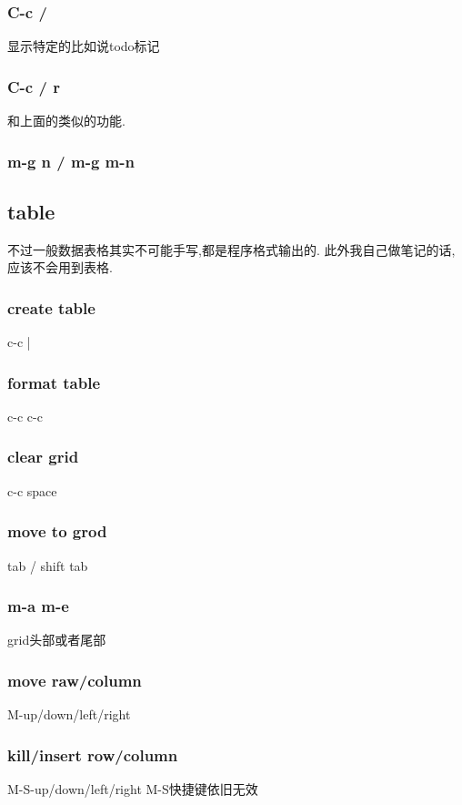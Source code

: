 \documentclass[12pt,a4paper]{article}
\begin{document}
\subsubsection{C-c /}
\label{sec:orgheadline58}
显示特定的比如说todo标记
\subsubsection{C-c / r}
\label{sec:orgheadline59}
和上面的类似的功能.
\subsubsection{m-g n / m-g m-n}
\label{sec:orgheadline60}
\subsection{table}
\label{sec:orgheadline70}
不过一般数据表格其实不可能手写,都是程序格式输出的.
此外我自己做笔记的话,应该不会用到表格.
\subsubsection{create table}
\label{sec:orgheadline62}
c-c |
\subsubsection{format table}
\label{sec:orgheadline63}
c-c c-c
\subsubsection{clear grid}
\label{sec:orgheadline64}
c-c space
\subsubsection{move to grod}
\label{sec:orgheadline65}
tab / shift tab
\subsubsection{m-a m-e}
\label{sec:orgheadline66}
grid头部或者尾部
\subsubsection{move raw/column}
\label{sec:orgheadline67}
M-up/down/left/right
\subsubsection{kill/insert row/column}
\label{sec:orgheadline68}
M-S-up/down/left/right
M-S快捷键依旧无效
\end{document}
